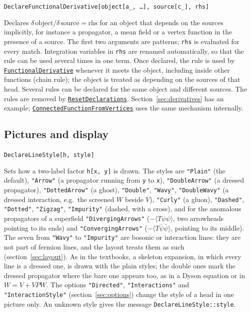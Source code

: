 \documentclass[11pt,a4paper]{article}
\makeatletter
\newcommand{\pkg}[1]{\texttt{#1}}
\newenvironment{function}[1]{\par\if@nobreak\else\medskip\needspace{4\baselineskip}\fi\noindent\phantomsection\label{fn:#1}%
  \begin{fnbox}}{\end{fnbox}\par\nobreak}
\newcommand{\syntax}[1]{\texttt{#1}\par}
\newcommand{\fnref}[1]{\hyperref[fn:#1]{\pkg{#1}}}
\newcommand{\opt}[1]{\texttt{"#1"}}
\makeatother
\begin{document}
\begin{function}{DeclareFunctionalDerivative}
\syntax{DeclareFunctionalDerivative[object[a\_, \dots], source[c\_], rhs]}
\end{function}
Declares $\delta\,\mathrm{object}/\delta\,\mathrm{source}=\mathrm{rhs}$ for an object that depends on the sources implicitly,
for instance a propagator, a mean field or a vertex function in the presence of a source. The first two arguments are
patterns; \pkg{rhs} is evaluated for every match. Integration variables in \pkg{rhs} are renamed automatically, so that
the rule can be used several times in one term. Once declared, the rule is used by \fnref{FunctionalDerivative} whenever
it meets the object, including inside other functions (chain rule); the object is treated as depending on the sources of
that head. Several rules can be declared for the same object and different sources. The rules are removed by
\fnref{ResetDeclarations}. Section~\ref{sec:derivatives} has an example; \fnref{ConnectedFunctionFromVertices} uses the same mechanism
internally.

\subsection{Pictures and display}

\begin{function}{DeclareLineStyle}
\syntax{DeclareLineStyle[h, style]}
\end{function}
Sets how a two-label factor \pkg{h[x, y]} is drawn. The styles are \opt{Plain} (the default), \opt{Arrow} (a propagator
running from \pkg{y} to \pkg{x}), \opt{DoubleArrow} (a dressed propagator), \opt{DottedArrow} (a ghost), \opt{Double},
\opt{Wavy}, \opt{DoubleWavy} (a dressed interaction, e.g.\ the screened $W$ beside $V$), \opt{Curly} (a gluon), \opt{Dashed},
\opt{Dotted}, \opt{Zigzag}, \opt{Impurity} (dashed, with a cross), and for the anomalous propagators of a superfield
\opt{DivergingArrows} ($-\langle T\psi\psi\rangle$, two arrowheads pointing to its ends) and \opt{ConvergingArrows}
($-\langle T\bar\psi\bar\psi\rangle$, pointing to its middle). The seven from \opt{Wavy} to \opt{Impurity} are bosonic or
interaction lines: they are not part of fermion lines, and the layout treats
them as such (section~\ref{sec:layout}). As in the textbooks, a skeleton expansion, in which every line is a dressed one,
is drawn with the plain styles; the double ones mark the dressed propagator where the bare one appears too, as in a Dyson
equation or in $W=V+VPW$. The options \opt{Directed}, \opt{Interactions} and \opt{InteractionStyle}
(section~\ref{sec:options}) change the style of a head in one picture only. An unknown style gives the message
\pkg{DeclareLineStyle::style}.
\end{document}
